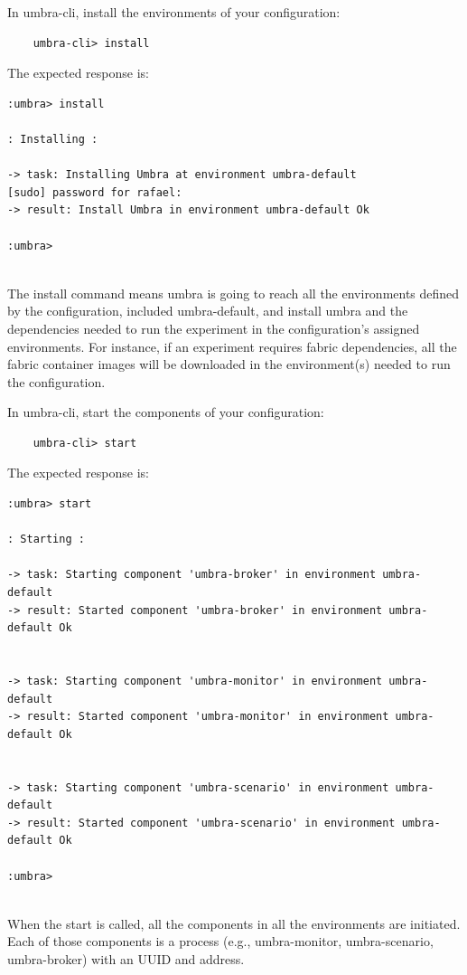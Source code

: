 \documentclass[12pt,a4paper]{article}
\theoremstyle{definition}
\begin{document}
In umbra-cli, install the environments of your configuration:
\begin{verbatim}
    umbra-cli> install

\end{verbatim}


The expected response is:
\begin{verbatim}
:umbra> install

: Installing :

-> task: Installing Umbra at environment umbra-default
[sudo] password for rafael: 
-> result: Install Umbra in environment umbra-default Ok

:umbra> 


\end{verbatim}


The install command means umbra is going to reach all the environments defined by the configuration, included umbra-default, and install umbra and the dependencies needed to run the experiment in the configuration's assigned environments. For instance, if an experiment requires fabric dependencies, all the fabric container images will be downloaded in the environment(s) needed to run the configuration.

In umbra-cli, start the components of your configuration:

\begin{verbatim}
    umbra-cli> start

\end{verbatim}


The expected response is:
\begin{verbatim}
:umbra> start

: Starting :

-> task: Starting component 'umbra-broker' in environment umbra-default
-> result: Started component 'umbra-broker' in environment umbra-default Ok


-> task: Starting component 'umbra-monitor' in environment umbra-default
-> result: Started component 'umbra-monitor' in environment umbra-default Ok


-> task: Starting component 'umbra-scenario' in environment umbra-default
-> result: Started component 'umbra-scenario' in environment umbra-default Ok

:umbra> 


\end{verbatim}

When the start is called, all the components in all the environments are initiated. Each of those components is a process (e.g., umbra-monitor, umbra-scenario, umbra-broker) with an UUID and address.
\end{document}
